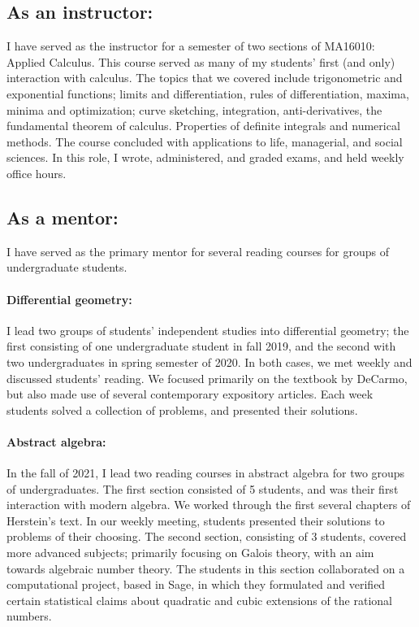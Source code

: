 \documentclass[12pt]{article}
\begin{document}
\subsection*{As an instructor:} I have served as the instructor for a semester of two sections of  MA16010: Applied Calculus.  This course served as many of my students' first (and only) interaction with calculus. The topics that we covered include trigonometric and exponential functions; limits and differentiation, rules of differentiation, maxima, minima and optimization; curve sketching, integration, anti-derivatives, the fundamental theorem of calculus. Properties of definite integrals and numerical methods. The course concluded with applications to life, managerial, and social sciences.  In this role, I wrote, administered, and graded exams, and held weekly office hours.   

\newpage

\subsection*{As a mentor:}
I have served as the primary mentor for several reading courses for groups of undergraduate students. 

\paragraph{Differential geometry:} I lead two groups of students' independent studies into differential geometry; the first consisting of one undergraduate student in fall 2019, and the second with two undergraduates in spring semester of 2020. In both cases, we met weekly and discussed students' reading. We focused primarily on the textbook by DeCarmo, but also made use of several contemporary expository articles. Each week students solved a collection of problems, and presented their solutions. 

\paragraph{Abstract algebra:} In the fall of 2021, I lead two reading courses in abstract algebra for two groups of undergraduates. The first section consisted of 5 students, and was their first interaction with modern algebra. We worked through the first several chapters of Herstein's text. In our weekly meeting, students presented their solutions to problems of their choosing. The second section, consisting of 3 students, covered more advanced subjects; primarily focusing on Galois theory, with an aim towards algebraic number theory. The students in this section collaborated on a computational project, based in Sage, in which they formulated and verified certain statistical claims about quadratic and cubic extensions of the rational numbers.  
\end{document}
